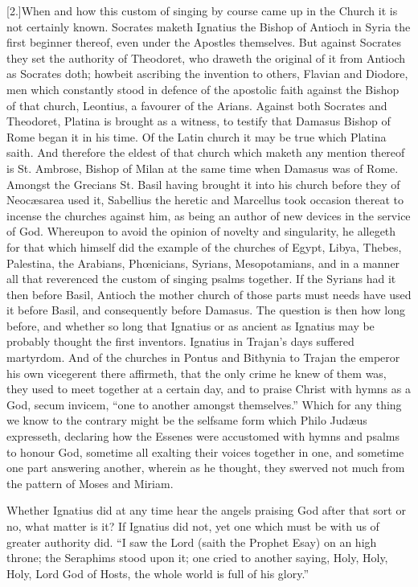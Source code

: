 [2.]When and how this custom of singing by course came up in the Church it is not certainly known. Socrates maketh Ignatius the Bishop of Antioch in Syria the first beginner thereof, even under the Apostles themselves. But against Socrates they set the authority of Theodoret, who draweth the original of it from Antioch as Socrates doth; howbeit ascribing the invention to others, Flavian and Diodore, men which constantly stood in defence of the apostolic faith against the Bishop of that church, Leontius, a favourer of the Arians. Against both Socrates and Theodoret, Platina is brought as a witness, to testify that Damasus Bishop of Rome began it in his time. Of the Latin church it may be true which Platina saith. And therefore the eldest of that church which maketh any mention thereof is St. Ambrose, Bishop of  Milan at the same time when Damasus was of Rome.
 Amongst the Grecians St. Basil having brought it into his church before they of Neocæsarea used it, Sabellius the heretic and Marcellus took occasion thereat to incense the churches against him, as being an author of new devices in the service of God. Whereupon to avoid the opinion of novelty and singularity, he allegeth for that which himself did the example of the churches of Egypt, Libya, Thebes, Palestina, the Arabians, Phœnicians, Syrians, Mesopotamians, and in a manner all that reverenced the custom of singing psalms together. If the Syrians had it then before Basil, Antioch the mother church of those parts must needs have used it before Basil, and consequently before Damasus. The question is then how long before, and whether so long that Ignatius or as ancient as Ignatius may be probably thought the first inventors. Ignatius in Trajan’s days suffered martyrdom. And of the churches in Pontus and Bithynia to Trajan the emperor his own vicegerent there affirmeth, that  the only crime he knew of them was,
 they used to meet together at a certain day, and to praise Christ with hymns as a God, secum invicem, “one to another amongst themselves.” Which for any thing we know to the contrary might be the selfsame form which Philo Judæus expresseth, declaring how the Essenes were accustomed with hymns and psalms to honour God, sometime all exalting their voices together in one, and sometime one part answering another, wherein as he thought, they swerved not much from the pattern of Moses and Miriam.

Whether Ignatius did at any time hear the angels praising God after that sort or no, what matter is it? If Ignatius did not, yet one which must be with us of greater authority did. “I saw the Lord (saith the Prophet Esay) on an high throne; the Seraphims stood upon it; one cried to another saying, Holy, Holy, Holy, Lord God of Hosts, the whole world is full of his glory.”

